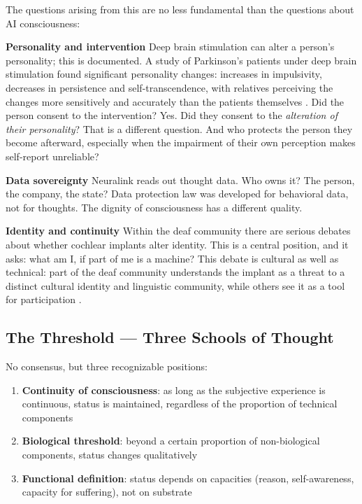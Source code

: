 \documentclass[acmlarge, nonacm]{acmart}
\begin{document}
The questions arising from this are no less fundamental than the questions about AI consciousness:

\textbf{Personality and intervention}
Deep brain stimulation can alter a person's personality; this is documented. A study of Parkinson's patients under deep brain stimulation found significant personality changes: increases in impulsivity, decreases in persistence and self-transcendence, with relatives perceiving the changes more sensitively and accurately than the patients themselves \cite{pham2015}. Did the person consent to the intervention? Yes. Did they consent to the \textit{alteration of their personality}? That is a different question. And who protects the person they become afterward, especially when the impairment of their own perception makes self-report unreliable?

\textbf{Data sovereignty}
Neuralink reads out thought data. Who owns it? The person, the company, the state? Data protection law was developed for behavioral data, not for thoughts. The dignity of consciousness has a different quality.

\textbf{Identity and continuity}
Within the deaf community there are serious debates about whether cochlear implants alter identity. This is a central position, and it asks: what am I, if part of me is a machine? This debate is cultural as well as technical: part of the deaf community understands the implant as a threat to a distinct cultural identity and linguistic community, while others see it as a tool for participation \cite{cherney1999,sparrow2005}.

\subsection{The Threshold --- Three Schools of Thought}

No consensus, but three recognizable positions:

\begin{enumerate}
\item \textbf{Continuity of consciousness}: as long as the subjective experience is continuous, status is maintained, regardless of the proportion of technical components
\item \textbf{Biological threshold}: beyond a certain proportion of non-biological components, status changes qualitatively
\item \textbf{Functional definition}: status depends on capacities (reason, self-awareness, capacity for suffering), not on substrate
\end{enumerate}
\end{document}

